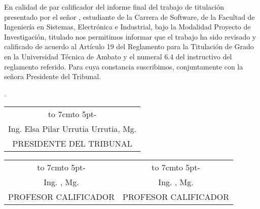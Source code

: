 \newpage
{}
En calidad de par calificador del informe final del trabajo de titulación presentado por el señor \autor, estudiante de la Carrera de Software,
de la Facultad de Ingeniería en Sistemas,
Electrónica e Industrial, bajo la Modalidad Proyecto de Investigación, titulado
	{\MakeUppercase\tema}
nos permitimos informar que el trabajo ha sido revisado
y calificado de acuerdo al Artículo 19 del Reglamento para la Titulación de Grado en
la Universidad Técnica de Ambato y el numeral 6.4 del instructivo del reglamento
referido. Para cuya constancia suscribimos, conjuntamente con la señora Presidente
del Tribunal.
\begin{flushright}
	\lugarFechaPrelims.
\end{flushright}


\vspace*{4cm}
\begin{center}
	\begin{tabular}{c}
		\hbox to 7cm{\leaders\hbox to 5pt{\hss - \hss}\hfil} \\
		Ing. Elsa Pilar Urrutia Urrutia, Mg.                 \\
		PRESIDENTE DEL TRIBUNAL                              \\
	\end{tabular}
\end{center}
\vspace*{20mm}
\begin{center}
	\begin{tabular}{c c}
		\hbox to 7cm{\leaders\hbox to 5pt{\hss - \hss}\hfil} & \hbox to 7cm{\leaders\hbox to 5pt{\hss - \hss}\hfil} \\
		Ing. , Mg.                                           & Ing. , Mg.                                           \\
		PROFESOR CALIFICADOR                                 & PROFESOR CALIFICADOR
	\end{tabular}
\end{center}
